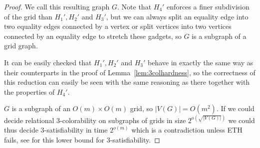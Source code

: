 \begin{proof}
    We call this resulting graph $G$.
    Note that $H_4'$ enforces a finer subdivision of the grid than $H_1', H_2'$ and $H_3'$, but we can always split an equality edge into two equality edges connected by a vertex or split vertices into two vertices connected by an equality edge to stretch these gadgets, so $G$ is a subgraph of a grid graph.

    It can be easily checked that $H_1', H_2'$ and $H_3'$ behave in exactly the same way as their counterparts in the proof of Lemma~\ref{lem:3colhardness}, so the correctness of this reduction can easily be seen with the same reasoning as there together with the properties of $H_4'$.

    $G$ is a subgraph of an $O(m) \times O(m)$ grid, so $|V(G)| = O(m^2)$.
    If we could decide relational $3$-colorability on subgraphs of grids in size $2^{o\left(\sqrt{|V(G)|}\right)}$ we could thus decide $3$-satisfiability in time $2^{o\left(m\right)}$ which is a contradiction unless ETH fails, see \cite{DBLP:journals/jcss/ImpagliazzoPZ01} for this lower bound for $3$-satisfiability.
\end{proof}

